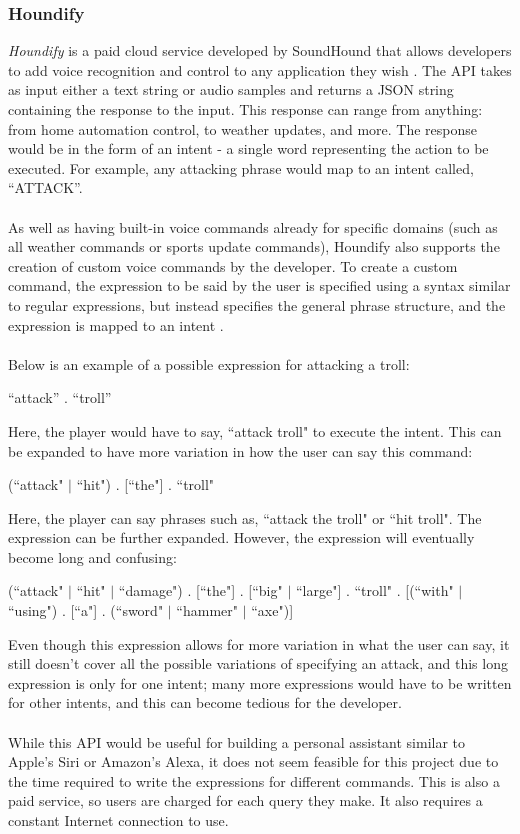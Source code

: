 \documentclass[11pt]{article}
\begin{document}
\subsubsection{Houndify}
\label{section:houndify}

\textit{Houndify} is a paid cloud service developed by SoundHound that allows developers to add voice recognition and control to any application they wish \cite{RefWorks:30}. The API takes as input either a text string or audio samples and returns a JSON string containing the response to the input. This response can range from anything: from home automation control, to weather updates, and more. The response would be in the form of an intent - a single word representing the action to be executed. For example, any attacking phrase would map to an intent called, ``ATTACK''.
\\
\\
As well as having built-in voice commands already for specific domains (such as all weather commands or sports update commands), Houndify also supports the creation of custom voice commands by the developer. To create a custom command, the expression to be said by the user is specified using a syntax similar to regular expressions, but instead specifies the general phrase structure, and the expression is mapped to an intent \cite{RefWorks:33}.
\\
\\
Below is an example of a possible expression for attacking a troll:
\begin{center}
``attack'' . ``troll''
\end{center}
Here, the player would have to say, ``attack troll" to execute the intent. This can be expanded to have more variation in how the user can say this command:
\begin{center}
(``attack" $\vert$ ``hit") . [``the"] . ``troll"
\end{center}
Here, the player can say phrases such as, ``attack the troll" or ``hit troll". The expression can be further expanded. However, the expression will eventually become long and confusing:
\begin{center}
(``attack" $\vert$ ``hit" $\vert$ ``damage") . [``the"] . [``big" $\vert$ ``large"] . ``troll" . [(``with" $\vert$ ``using") . [``a"] . (``sword" $\vert$ ``hammer" $\vert$ ``axe")]
\end{center}
Even though this expression allows for more variation in what the user can say, it still doesn't cover all the possible variations of specifying an attack, and this long expression is only for one intent; many more expressions would have to be written for other intents, and this can become tedious for the developer.
\\
\\
While this API would be useful for building a personal assistant similar to Apple's Siri or Amazon's Alexa, it does not seem feasible for this project due to the time required to write the expressions for different commands. This is also a paid service, so users are charged for each query they make. It also requires a constant Internet connection to use.
\end{document}
